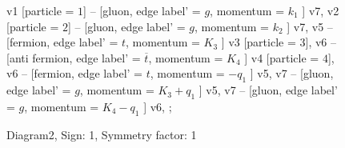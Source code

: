 \documentclass{revtex4}
\begin{document}
\begin{figure}[!htb]
\begin{center}
{    %
v1 [particle = \(1\)] -- [gluon, edge label' = \(g\), momentum = \(k_{1}\) ] v7, 
v2 [particle = \(2\)] -- [gluon, edge label' = \(g\), momentum = \(k_{2}\) ] v7, 
v5 -- [fermion, edge label' = \(t\), momentum = \(K_{3}\) ] v3 [particle = \(3\)], 
v6 -- [anti fermion, edge label' = \(\overline{t}\), momentum = \(K_{4}\) ] v4 [particle = \(4\)], 
v6 -- [fermion, edge label' = \(t\), momentum = \(-q_{1}\) ] v5, 
v7 -- [gluon, edge label' = \(g\), momentum = \(K_{3} + q_{1}\) ] v5, 
v7 -- [gluon, edge label' = \(g\), momentum = \(K_{4} - q_{1}\) ] v6, 
};
\end{center}
\caption{Diagram2, Sign: 1, Symmetry factor: 1}
\end{figure}
\newpage
\end{document}
